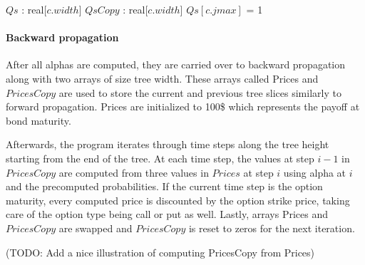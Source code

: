 {
\setlength{\interspacetitleruled}{-.4pt}%
\begin{algorithm}[H]
    \DontPrintSemicolon
    \setcounter{AlgoLine}{16}
    
    \;
    $Qs$ : real[$c.width$]\;
    $QsCopy$ : real[$c.width$]\;
    $Qs[c.jmax]$ = 1 
    \;
\end{algorithm}
}

\pagebreak
\paragraph{Backward propagation}
After all alphas are computed, they are carried over to backward propagation along with two arrays of size tree width. These arrays called Prices and $PricesCopy$ are used to store the current and previous tree slices similarly to forward propagation. Prices are initialized to 100\$ which represents the payoff at bond maturity.

Afterwards, the program iterates through time steps along the tree height starting from the end of the tree. At each time step, the values at step $i-1$ in $PricesCopy$ are computed from three values in $Prices$ at step $i$ using alpha at $i$ and the precomputed probabilities. If the current time step is the option maturity, every computed price is discounted by the option strike price, taking care of the option type being call or put as well. Lastly, arrays Prices and $PricesCopy$ are swapped and $PricesCopy$ is reset to zeros for the next iteration.

(TODO: Add a nice illustration of computing PricesCopy from Prices)

